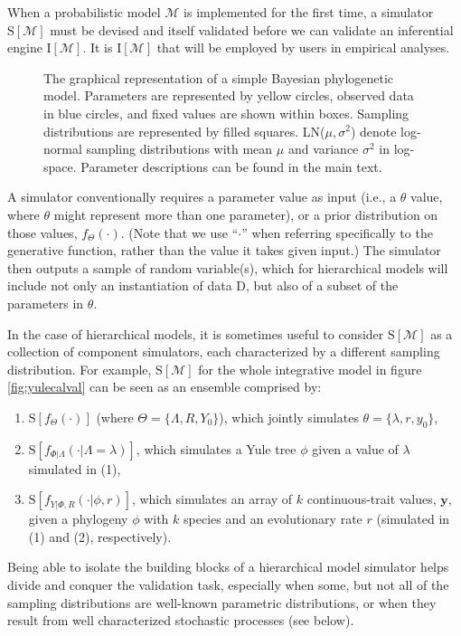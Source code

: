 \documentclass[oneside]{article}
\begin{document}
When a probabilistic model $\mathcal{M}$ is implemented for the first
time, a simulator $\text{S}[\mathcal{M}]$ must be devised and itself
validated before we can validate an inferential engine $\text{I}[\mathcal{M}]$.
It is $\text{I}[\mathcal{M}]$ that will be employed by users in empirical
analyses.
\begin{figure}
      
  \caption{The graphical representation of a simple Bayesian
    phylogenetic model.
    Parameters are represented by yellow circles, observed data
    in blue circles, and fixed values are shown within boxes.
    Sampling distributions are represented by filled squares.
    LN($\mu,\sigma^2$) denote log-normal sampling distributions
    with mean $\mu$ and variance $\sigma^2$ in log-space.
    Parameter descriptions can be found in the main text.
    }
  \label{fig:pgm}
\end{figure}
A simulator conventionally requires a parameter value as input (i.e., a $\theta$ value, where $\theta$ might represent more than one parameter), or a prior distribution on those values, $f_\Theta(\cdot)$. 
(Note that we use ``$\cdot$'' when referring specifically to the generative function, rather than the value it takes given input.)
The simulator then outputs a sample of random variable(s), which for hierarchical models will include not only an instantiation of data $\text{D}$, but also of a subset of the parameters in $\theta$.
 
In the case of hierarchical models, it is sometimes useful to consider $\text{S}[\mathcal{M}]$ as a collection of component simulators, each characterized by a different sampling distribution.
For example, $\text{S}[\mathcal{M}]$ for the whole integrative model
in figure \ref{fig:yulecalval} can be seen as an ensemble comprised
by:
\begin{enumerate}
  \item $\text{S}[f_\Theta(\cdot)]$ (where $\Theta = \{\Lambda, R, Y_0\}$), which jointly simulates $\theta=\{\lambda,r,y_0\}$,
  \item $\text{S}[f_{\Phi|\Lambda}(\cdot|\Lambda=\lambda)]$, which simulates a Yule tree $\phi$ given a value of $\lambda$ simulated in (1),
  \item $\text{S}[f_{Y|\Phi,R}(\cdot|\phi,r)]$, which simulates an array of $k$ continuous-trait values, $\boldsymbol{y}$, given a phylogeny $\phi$ with $k$ species and an evolutionary rate $r$ (simulated in (1) and (2), respectively).
\end{enumerate}
Being able to isolate the building blocks of a hierarchical model simulator helps divide and conquer the validation task, especially when some, but not all of the sampling distributions are well-known parametric distributions, or when they result from well characterized stochastic processes (see below).
\end{document}
